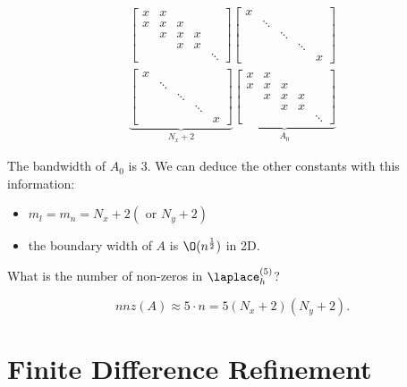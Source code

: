 \begin{align*}
\begin{bmatrix}
	x & x &   &   & \\
	x & x & x &   & \\
	  & x & x & x & \\
	  &   & x & x & \\
	  &   &   &   & \ddots
\end{bmatrix}
\begin{bmatrix}
	x &   &   &   & \\
	  & \ddots &   &   & \\
	  &   & \ddots &   & \\
	  &   &   & \ddots & \\
	  &   &   &   & x
\end{bmatrix} \\
\underbrace{ 
\begin{bmatrix}
	x &   &   &   & \\
	  & \ddots &   &   & \\
	  &   & \ddots &   & \\
	  &   &   & \ddots & \\
	  &   &   &   & x
\end{bmatrix}}_{N_{x}+2}
\underbrace{ 
\begin{bmatrix}
	x & x &   &   & \\
	x & x & x &   & \\
	  & x & x & x & \\
	  &   & x & x & \\
	  &   &   &   & \ddots
\end{bmatrix}}_{A_0}
\end{align*}

The bandwidth of $A_0$ is 3.
We can deduce the other constants with this information:
\begin{itemize}
	\item $m_{l}=m_{n}=N_{x}+2 (\text{ or } N_{y}+2)$
	\item the boundary width of $A$ is $\O(n^{\frac{1}{2}})$ in 2D.
\end{itemize}

What is the number of non-zeros in $\laplace_{h}^{(5)} $?

\[
	nnz(A) \approx 5 \cdot n = 5(N_{x} +2)(N_{y} +2)
.\] 

\section{Finite Difference Refinement}%
\label{sec:Finite Difference Refinement}

